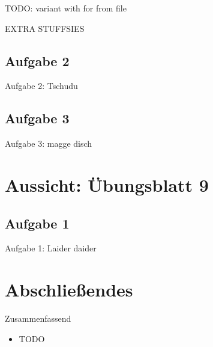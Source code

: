 {\begin{frame}
    TODO: variant with for from file
\end{frame}

\begin{frame}
    EXTRA STUFFSIES
\end{frame}
}

\subsection{Aufgabe 2}
\begin{frame}{Aufgabe 2: Tschudu}
\end{frame}

\subsection{Aufgabe 3}
\begin{frame}{Aufgabe 3: magge disch}
\end{frame}

\iffull
{}
\section{Aussicht: Übungsblatt 9}
\subsection{Aufgabe 1}
\begin{frame}{Aufgabe 1: Laider daider}
\end{frame}

\fi

\section{Abschließendes}
{\SummaryFrame
\begin{frame}[t]{Zusammenfassend}
\pause \printBibCommand
\vfill\vfill %
\begin{itemize}[<+(1)->]
    \itemsep4pt
    \item TODO
\end{itemize}
\end{frame}
}


\iffull\fi
